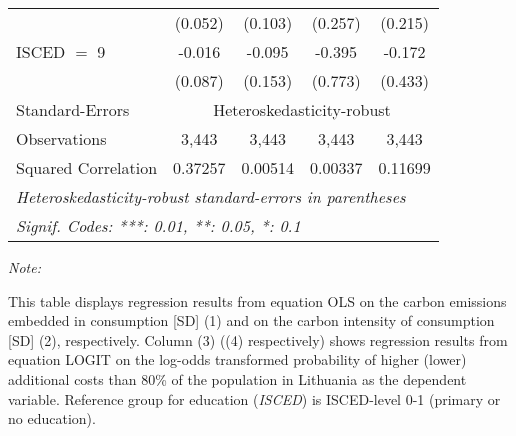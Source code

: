 \begin{table}[htbp!]
\begin{adjustbox}{width = 1\textwidth, max height = 0.95\textheight, center}
\begin{threeparttable}[b]
\begin{tabular}{lcccc}
                                 & (0.052)            & (0.103)            & (0.257)       & (0.215)\\   
            ISCED $=$ 9          & -0.016             & -0.095             & -0.395        & -0.172\\   
                                 & (0.087)            & (0.153)            & (0.773)       & (0.433)\\   
            \midrule 
            Standard-Errors & \multicolumn{4}{c}{Heteroskedasticity-robust} \\ 
            Observations         & 3,443              & 3,443              & 3,443         & 3,443\\  
            Squared Correlation  & 0.37257            & 0.00514            & 0.00337       & 0.11699\\  
            \midrule \midrule
            \multicolumn{5}{l}{\emph{Heteroskedasticity-robust standard-errors in parentheses}}\\
            \multicolumn{5}{l}{\emph{Signif. Codes: ***: 0.01, **: 0.05, *: 0.1}}\\
         \end{tabular}
         
         \begin{tablenotes}\item \medskip \textit{Note:}
            \item This table displays regression results from equation OLS on the carbon emissions embedded in consumption [SD] (1) and on the carbon intensity of consumption [SD] (2), respectively. 
                                      Column (3) ((4) respectively) shows regression results from equation LOGIT on the log-odds transformed probability of higher (lower) additional costs than 80\% of the population in Lithuania as the dependent variable. Reference group for education (\textit{ISCED}) is ISCED-level 0-1 (primary or no education).
         \end{tablenotes}
      \end{threeparttable}
   \end{adjustbox}
\end{table}


